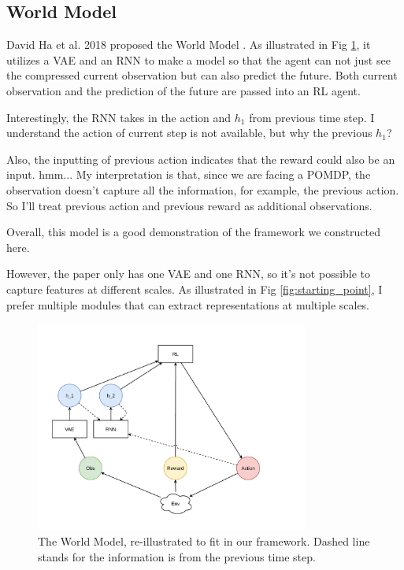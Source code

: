 \subsection{World Model}
David Ha et al. 2018 proposed the World Model \cite{ha_world_2018}.
As illustrated in Fig \ref{fig:world_model}, it utilizes a VAE and an RNN to make a model so that the agent can not just see the compressed current observation but can also predict the future.
Both current observation and the prediction of the future are passed into an RL agent.

Interestingly, the RNN takes in the action and $h_1$ from previous time step. I understand the action of current step is not available, but why the previous $h_1$?

Also, the inputting of previous action indicates that the reward could also be an input. hmm... My interpretation is that, since we are facing a POMDP, the observation doesn't capture all the information, for example, the previous action. So I'll treat previous action and previous reward as additional observations.

Overall, this model is a good demonstration of the framework we constructed here.

However, the paper only has one VAE and one RNN, so it's not possible to capture features at different scales.
As illustrated in Fig \ref{fig:starting_point}, I prefer multiple modules that can extract representations at multiple scales.

\begin{figure}[h]
    \centering
    \includegraphics[width=0.8\textwidth]{images/world-model.pdf}
    \caption{The World Model, re-illustrated to fit in our framework. Dashed line stands for the information is from the previous time step.}
    \label{fig:world_model}
\end{figure}

